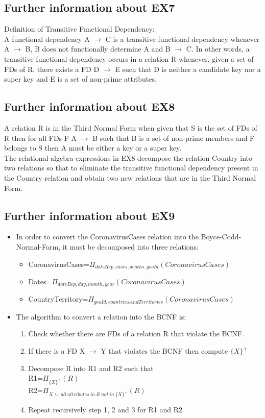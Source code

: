 \documentclass{article}
\begin{document}
\subsection{Further information about EX7} \label{EX7}
Definition of Transitive Functional Dependency:\\
A functional dependency A $\rightarrow$ C is a transitive functional dependency whenever A $\rightarrow$ B, B does not functionally determine A and B $\rightarrow$ C. In other words, a transitive functional dependency occurs in a relation R whenever, given a set of FDs of R, there exists a FD D $\rightarrow$ E  such that D is neither a candidate key nor a super key and E is a set of non-prime attributes.
\subsection{Further information about EX8} \label{EX8}
A relation R is in the Third Normal Form when given that S is the set of FDs of R then for all FDs F A $\rightarrow$ B such that B is a set of non-prime members and F belongs to S then A must be either a key or a super key.\\
The relational-algebra expressions in EX8 decompose the relation Country into two relations so that to eliminate the transitive functional dependency present in the Country relation and obtain two new relations that are in the Third Normal Form.
\subsection{Further information about EX9} \label{EX9}
\begin{itemize}
    \item 
In order to convert the CoronavirusCases relation into the Boyce-Codd-Normal-Form, it must be decomposed into three relations:
\begin{itemize}
    \item CoronavirusCases=$\Pi_{dateRep,cases, deaths, geoId}(CoronavirusCases)$
    \item Dates=$\Pi_{dateRep,day,month,year}(CoronavirusCases)$
    \item CountryTerritory=$\Pi_{geoId, countriesAndTerritories}(CoronavirusCases)$
\end{itemize}
\item The algorithm to convert a relation into the BCNF is:
\begin{enumerate}
    \item Check whether there are FDs of a relation R that violate the BCNF.
    \item If there is a FD X $\rightarrow$ Y that violates the BCNF then compute $\{X\}^{+}$
    \item Decompose R into R1 and R2 such that\\
    R1=$\Pi_{\{X\}^+}(R)$\\
    R2=$\Pi_{X \: \cup \: all \: attributes \: in \: R \: not \: in \:  \{X\}^+}(R)$
    \item Repeat recursively step 1, 2 and 3 for R1 and R2
    
\end{enumerate}
\end{itemize}
\end{document}
